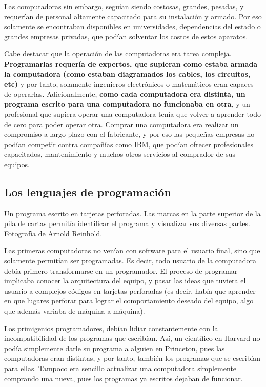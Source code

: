Las computadoras sin embargo, seguían siendo costosas, grandes, pesadas, y
requerían de personal altamente capacitado para su instalación y armado. Por
eso solamente se encontraban disponibles en universidades, dependencias del
estado o grandes empresas privadas, que podían solventar los costos de estos
aparatos.

Cabe destacar que la operación de las computadoras era tarea compleja.
\textbf{Programarlas requería de expertos, que supieran como estaba armada la
computadora (como estaban diagramados los cables, los circuitos, etc)} y por
tanto, solamente ingenieros electrónicos o matemáticos eran capaces de
operarlas. Adicionalmente, \textbf{como cada computadora era distinta, un
programa escrito para una computadora no funcionaba en otra}, y un profesional
que supiera operar una computadora tenía que volver a aprender todo de cero
para poder operar otra. Comprar una computadora era realizar un compromiso a
largo plazo con el fabricante, y por eso las pequeñas empresas no podían
competir contra compañías como IBM, que podían ofrecer profesionales capacitados,
mantenimiento y muchos otros servicios al comprador de sus equipos.

\subsection{Los lenguajes de programación}

{Un programa escrito en tarjetas perforadas. Las marcas en la parte superior
de la pila de cartas permitía identificar el programa y visualizar sus diversas
partes.}
{Fotografía de Arnold Reinhold.}

Las primeras computadoras no venían con software para el usuario final, sino que
solamente permitían ser programadas. Es decir, todo usuario de la computadora
debía primero transformarse en un programador. El proceso de programar
implicaba conocer la arquitectura del equipo, y pasar las ideas que tuviera el
usuario a complejos códigos en tarjetas perforadas (es decir, había que aprender
en que lugares perforar para lograr el comportamiento deseado del equipo, algo
que además variaba de máquina a máquina).

Los primigenios programadores, debían lidiar constantemente con la
incompatibilidad de los programas que escribían. Así, un científico en Harvard
no podía simplemente darle su programa a alguien en Princeton, pues las
computadoras eran distintas, y por tanto, también los programas que se escribían
para ellas. Tampoco era sencillo actualizar una computadora simplemente comprando
una nueva, pues los programas ya escritos dejaban de funcionar.

